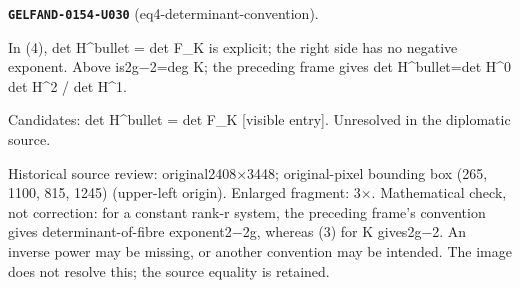 \par\noindent\leavevmode{}\label{GELFAND-0154-U030}\textbf{\texttt{GELFAND-0154-U030}} (eq4-determinant-convention).\nopagebreak[4]\par
In (4), det H\textasciicircum{}bullet = det F\_K is explicit; the right side has no negative exponent. Above is2g−2=deg K; the preceding frame gives det H\textasciicircum{}bullet=det H\textasciicircum{}0 det H\textasciicircum{}2 / det H\textasciicircum{}1.\par
Candidates: det H\textasciicircum{}bullet = det F\_K [visible entry]. Unresolved in the diplomatic source.\par
Historical source review: original2408×3448; original-pixel bounding box (265, 1100, 815, 1245) (upper-left origin). Enlarged fragment: 3×. Mathematical check, not correction: for a constant rank-r system, the preceding frame’s convention gives determinant-of-fibre exponent2−2g, whereas (3) for K gives2g−2. An inverse power may be missing, or another convention may be intended. The image does not resolve this; the source equality is retained.\par\medskip
